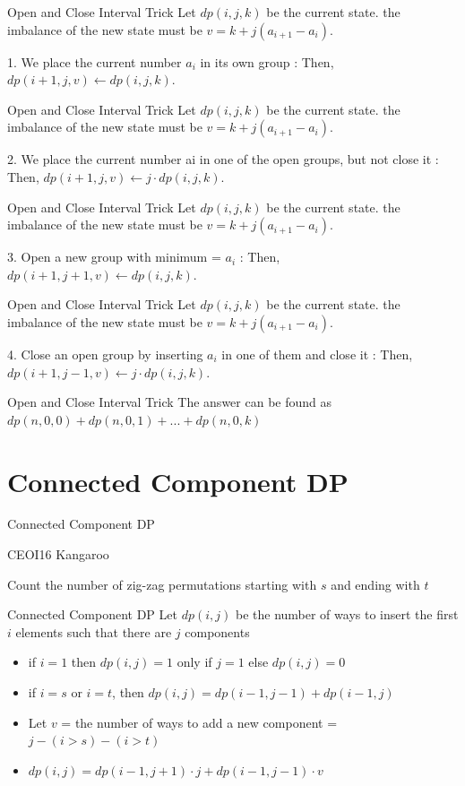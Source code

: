\documentclass[aspectratio=169,xcolor=dvipsnames]{beamer}
\begin{document}
\begin{frame}[plain, t]{Open and Close Interval Trick}
Let $dp(i, j, k)$ be the current state. the imbalance of the new state must be $v = k + j(a_{i+1} - a_i)$.

1. We place the current number $a_i$ in its own group : Then, $dp(i+1, j, v) \leftarrow dp(i, j, k)$.
\end{frame}
\begin{frame}[plain, t]{Open and Close Interval Trick}
Let $dp(i, j, k)$ be the current state. the imbalance of the new state must be $v = k + j(a_{i+1} - a_i)$.

2. We place the current number ai in one of the open groups, but not close it : Then, $dp(i+1, j, v) \leftarrow j \cdot dp(i, j, k)$.
\end{frame}
\begin{frame}[plain, t]{Open and Close Interval Trick}
Let $dp(i, j, k)$ be the current state. the imbalance of the new state must be $v = k + j(a_{i+1} - a_i)$.

3. Open a new group with minimum = $a_i$ : Then, $dp(i+1, j+1, v) \leftarrow dp(i, j, k)$.
\end{frame}
\begin{frame}[plain, t]{Open and Close Interval Trick}
Let $dp(i, j, k)$ be the current state. the imbalance of the new state must be $v = k + j(a_{i+1} - a_i)$.

4. Close an open group by inserting $a_i$ in one of them and close it : Then, $dp(i+1, j-1, v) \leftarrow j \cdot dp(i, j, k)$.
\end{frame}

\begin{frame}[plain, t]{Open and Close Interval Trick}
The answer can be found as $dp(n, 0, 0) + dp(n, 0, 1) + ... + dp(n, 0, k)$
\end{frame}
\section{Connected Component DP}
\begin{frame}[plain, t]{Connected Component DP}

{\Large CEOI16 Kangaroo}

Count the number of zig-zag permutations starting with $s$ and ending with $t$
\end{frame}

\begin{frame}[plain, t]{Connected Component DP}
Let $dp(i, j)$ be the number of ways to insert the first $i$ elements such that there are $j$ components

\begin{itemize}
    \item<2-> if $i = 1$ then $dp(i, j) = 1$ only if $j = 1$ else $dp(i, j) = 0$
    \item<3-> if $i = s$ or $i = t$, then $dp(i, j) = dp(i-1, j-1) + dp(i-1, j)$
    \item<4-> Let $v$ = the number of ways to add a new component = $j - (i > s) - (i > t)$
    \item<4-> $dp(i, j) = dp(i-1, j+1) \cdot j + dp(i-1, j-1) \cdot v$
    \end{itemize}

\end{frame}
\end{document}
